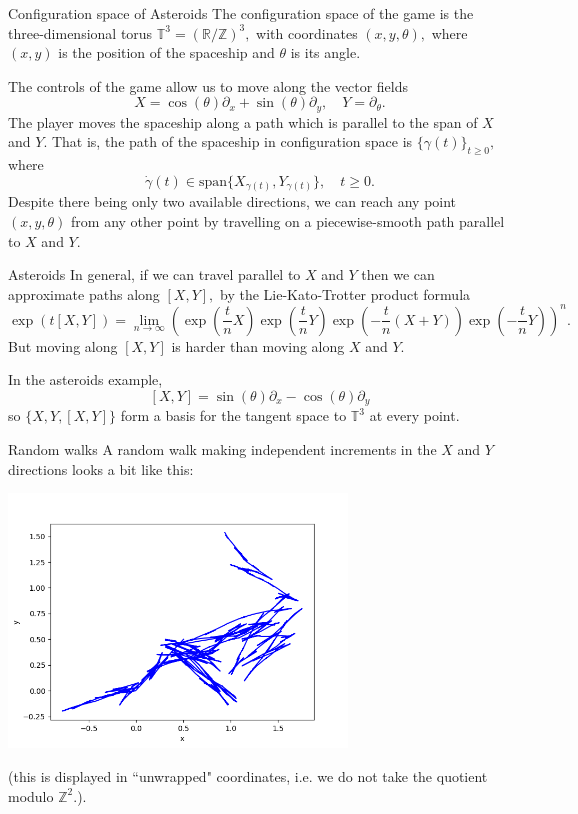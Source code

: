 \documentclass{beamer}
\numberwithin{equation}{section}
\theoremstyle{plain}
\theoremstyle{plain}
\theoremstyle{definition}
\theoremstyle{plain}
\theoremstyle{plain}
\theoremstyle{definition}
\newcommand{\Rl}{\mathbb{R}}
\newcommand{\Itgr}{\mathbb{Z}}
\newcommand{\Circ}{\mathbb{T}}
\begin{document}
\begin{frame}{Configuration space of Asteroids}
  The configuration space of the game is the three-dimensional torus $\Circ^3 = (\Rl/\Itgr)^3,$ with coordinates $(x,y,\theta),$ where $(x,y)$ is the position of the spaceship and $\theta$ is its angle.

  The controls of the game allow us to move along the vector fields
  \[
    X = \cos(\theta)\partial_x+\sin(\theta)\partial_y,\quad Y = \partial_\theta.
  \]
  \pause
  The player moves the spaceship along a path which is parallel to the span of $X$ and $Y.$ That is, the path of the spaceship in configuration space is $\{\gamma(t)\}_{t\geq 0},$ where
  \[
    \dot{\gamma}(t) \in \mathrm{span}\{X_{\gamma(t)},Y_{\gamma(t)}\},\quad t\geq 0.
  \]
  \pause
  Despite there being only two available directions, we can reach any point $(x,y,\theta)$ from any other point by travelling on a piecewise-smooth path parallel to $X$ and $Y.$
\end{frame}

\begin{frame}{Asteroids}
  In general, if we can travel parallel to $X$ and $Y$ then we can approximate paths along $[X,Y],$ by the Lie-Kato-Trotter product formula
  \[
    \exp(t[X,Y]) = \lim_{n\to\infty} (\exp(\frac{t}{n}X)\exp(\frac{t}{n}Y)\exp(-\frac{t}{n}(X+Y))\exp(-\frac{t}{n}Y))^n.
  \]
  But moving along $[X,Y]$ is harder than moving along $X$ and $Y.$

  In the asteroids example,
  \[
    [X,Y] = \sin(\theta)\partial_x-\cos(\theta)\partial_y
  \]
  so $\{X,Y,[X,Y]\}$ form a basis for the tangent space to $\Circ^3$ at every point.
\end{frame}


\begin{frame}{Random walks}
  A random walk making independent increments in the $X$ and $Y$ directions looks a bit like this:
  \begin{center}
  \includegraphics[width=90mm]{xy_coords_single_paths.png}
  \end{center}
  (this is displayed in ``unwrapped" coordinates, i.e. we do not take the quotient modulo $\Itgr^2.$).
\end{frame}
\end{document}
